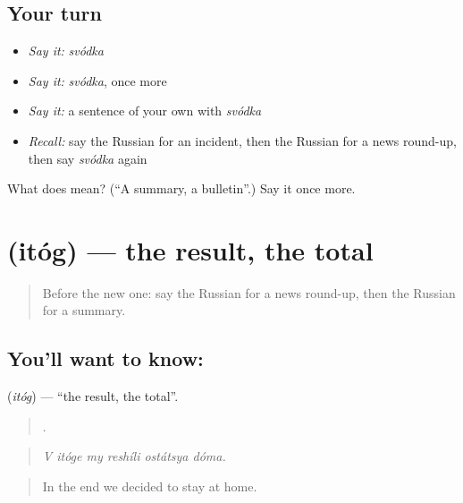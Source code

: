 \subsection*{Your turn}
\begin{itemize}
\raggedright
  \item \emph{Say it:} \emph{svódka}
  \item \emph{Say it:} \emph{svódka}, once more
  \item \emph{Say it:} a sentence of your own with \emph{svódka}
  \item \emph{Recall:} say the Russian for an incident, then the Russian for a news round-up, then say \emph{svódka} again
\end{itemize}

\begin{tcolorbox}[breakable,colback=teal!4,colframe=teal!35!black,title={Before you move on}]
What does  mean? (\textquotedblleft{}A summary, a bulletin\textquotedblright{}.) Say it once more.
\end{tcolorbox}
\section[\texorpdfstring{\ru{итог} (itóg)}{итог (itóg)}]{ (itóg) — the result, the total}

\label{lesson:RU-C285-itog}



\begin{quote}
Before the new one: say the Russian for a news round-up, then the Russian for a summary.
\end{quote}

\subsection*{You'll want to know: }
\textbf{} (\emph{itóg}) — \textquotedblleft{}the result, the total\textquotedblright{}.

\begin{quote}
     .
\end{quote}

\begin{quote}
\emph{V itóge my reshíli ostátsya dóma.}
\end{quote}

\begin{quote}
In the end we decided to stay at home.
\end{quote}

